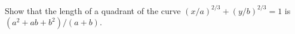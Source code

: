 Show that the length of a quadrant of the curve $(x/a)^{2/3} + (y/b)^{2/3} = 1$ is
$(a^{2} + ab + b^{2})/(a + b)$. 

